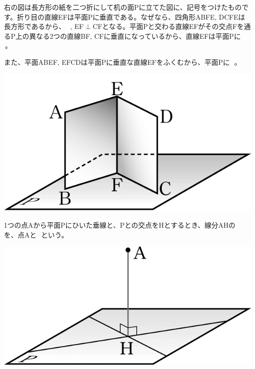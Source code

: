 \documentclass[
  12pt,a4paper,lualatex,ja=standard]{bxjsarticle}
\begin{document}
\newpage

\begin{multicols}{2}
右の図は長方形の紙を二つ折にして机の面Pに立てた図に、記号をつけたものです。折り目の直線EFは平面Pに垂直である。なぜなら、四角形ABFE, DCFEは長方形であるから、\,  \,, EF$\perp$CFとなる。平面Pと交わる直線EFがその交点Fを通るP上の異なる2つの直線BF, CFに垂直になっているから、直線EFは平面Pに\,  \,。

また、平面ABEF, EFCDは平面Pに垂直な直線EFをふくむから、平面Pに\,  \,。

\columnbreak

\begin{center}
\includegraphics{media/image57.png}
\end{center}
\end{multicols}

\begin{multicols}{2}
1つの点Aから平面Pにひいた垂線と、Pとの交点をHとするとき、線分AHの\,  \,を、点Aと\,  \,という。

\columnbreak

\begin{center}
\includegraphics{media/image78.png}
\end{center}

\end{multicols}
\end{document}
